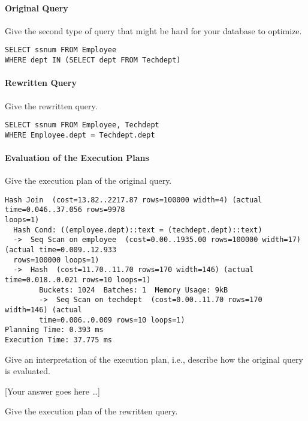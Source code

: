 \documentclass[11pt]{scrartcl}
\newcommand{\youranswerhere}{[Your answer goes here \ldots]}
\begin{document}
    \paragraph{Original Query}

    Give the second type of query that might be hard for your database to optimize.

    \begin{lstlisting}[style=dbtsql]
SELECT ssnum FROM Employee
WHERE dept IN (SELECT dept FROM Techdept)
    \end{lstlisting}

    \paragraph{Rewritten Query}

    Give the rewritten query.

    \begin{lstlisting}[style=dbtsql]
SELECT ssnum FROM Employee, Techdept
WHERE Employee.dept = Techdept.dept
    \end{lstlisting}

    \paragraph{Evaluation of the Execution Plans}

    Give the execution plan of the original query.

            {\small
    \parskip0pt
    \begin{verbatim}
Hash Join  (cost=13.82..2217.87 rows=100000 width=4) (actual time=0.046..37.056 rows=9978 
loops=1)
  Hash Cond: ((employee.dept)::text = (techdept.dept)::text)
  ->  Seq Scan on employee  (cost=0.00..1935.00 rows=100000 width=17) (actual time=0.009..12.933 
  rows=100000 loops=1)
  ->  Hash  (cost=11.70..11.70 rows=170 width=146) (actual time=0.018..0.021 rows=10 loops=1)
        Buckets: 1024  Batches: 1  Memory Usage: 9kB
        ->  Seq Scan on techdept  (cost=0.00..11.70 rows=170 width=146) (actual 
        time=0.006..0.009 rows=10 loops=1)
Planning Time: 0.393 ms
Execution Time: 37.775 ms
    \end{verbatim}}

    Give an interpretation of the execution plan, i.e., describe how the original query is evaluated.

    \youranswerhere{}

    Give the execution plan of the rewritten query.
\end{document}
